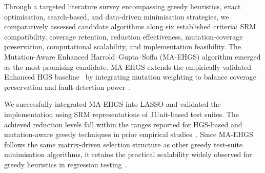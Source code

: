Through a targeted literature survey encompassing greedy heuristics, exact optimisation, search-based, and data-driven minimisation strategies, we comparatively assessed candidate algorithms along six established criteria: SRM compatibility, coverage retention, reduction effectiveness, mutation-coverage preservation, computational scalability, and implementation feasibility. The Mutation-Aware Enhanced Harrold--Gupta--Soffa (MA-EHGS) algorithm emerged as the most promising candidate. MA-EHGS extends the empirically validated Enhanced HGS baseline~\cite{gladston2015} by integrating mutation weighting to balance coverage preservation and fault-detection power~\cite{jehan2023}.

We successfully integrated MA-EHGS into LASSO and validated the implementation using SRM representations of JUnit-based test suites.
The achieved reduction levels fall within the ranges reported for HGS-based and mutation-aware greedy techniques in prior empirical studies~\cite{gladston2015,jehan2023}.
Since MA-EHGS follows the same matrix-driven selection structure as other greedy test-suite minimisation algorithms, it retains the practical scalability widely observed for greedy heuristics in regression testing~\cite{yoo2012,noemmer2020}.